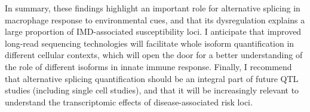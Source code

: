 In summary, these findings highlight an important role for alternative splicing in macrophage response to environmental cues, and that its dysregulation explains a large proportion of IMD-associated susceptibility loci. I anticipate that improved long-read sequencing technologies will facilitate whole isoform quantification in different cellular contexts, which will open the door for a better understanding of the role of different isoforms in innate immune response. Finally, I recommend that alternative splicing quantification should be an integral part of future QTL studies (including single cell studies), and that it will be increasingly relevant to understand the transcriptomic effects of disease-associated risk loci. 
\newpage





